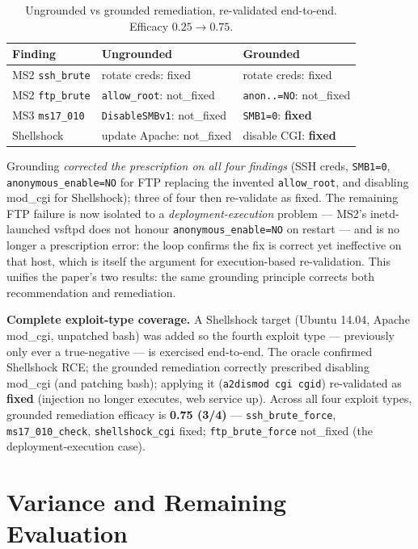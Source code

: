 \documentclass[conference]{IEEEtran}
\newcommand{\code}[1]{\texttt{#1}}
\begin{document}
\begin{table}[t]
\caption{Ungrounded vs grounded remediation, re-validated end-to-end.
Efficacy $0.25 \rightarrow 0.75$.}
\label{tab:grounded}
\centering
\begin{tabular}{lll}
\toprule
Finding & Ungrounded & Grounded \\
\midrule
MS2 \code{ssh\_brute}  & rotate creds: fixed & rotate creds: fixed \\
MS2 \code{ftp\_brute}  & \code{allow\_root}: not\_fixed & \code{anon..=NO}: not\_fixed \\
MS3 \code{ms17\_010}   & \code{DisableSMBv1}: not\_fixed & \code{SMB1=0}: \textbf{fixed} \\
Shellshock & update Apache: not\_fixed & disable CGI: \textbf{fixed} \\
\bottomrule
\end{tabular}
\end{table}

Grounding \emph{corrected the prescription on all four findings} (SSH creds,
\code{SMB1=0}, \code{anonymous\_enable=NO} for FTP replacing the invented
\code{allow\_root}, and disabling mod\_cgi for Shellshock); three of four then
re-validate as fixed. The remaining FTP
failure is now isolated to a \emph{deployment-execution} problem --- MS2's
inetd-launched vsftpd does not honour \code{anonymous\_enable=NO} on restart ---
and is no longer a prescription error: the loop confirms the fix is correct yet
ineffective on that host, which is itself the argument for execution-based
re-validation. This unifies the paper's two results: the same grounding principle
corrects both recommendation and remediation.

\noindent\textbf{Complete exploit-type coverage.} A Shellshock target (Ubuntu
14.04, Apache mod\_cgi, unpatched bash) was added so the fourth exploit type ---
previously only ever a true-negative --- is exercised end-to-end. The oracle
confirmed Shellshock RCE; the grounded remediation correctly prescribed disabling
mod\_cgi (and patching bash); applying it (\code{a2dismod cgi cgid}) re-validated
as \textbf{fixed} (injection no longer executes, web service up). Across all four
exploit types, grounded remediation efficacy is \textbf{0.75 (3/4)} ---
\code{ssh\_brute\_force}, \code{ms17\_010\_check}, \code{shellshock\_cgi} fixed;
\code{ftp\_brute\_force} not\_fixed (the deployment-execution case).

\section{Variance and Remaining Evaluation}\label{sec:remaining}
\end{document}
